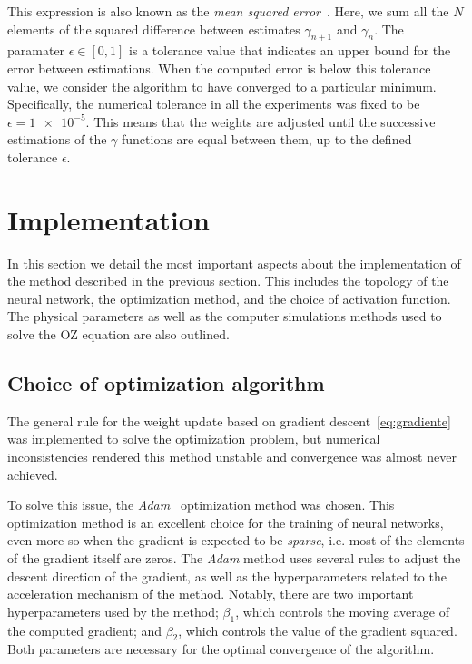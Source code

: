 This expression is also known as the \emph{mean squared error}~\cite{goodfellowDeepLearning2016}.
Here, we sum all the $N$ elements of the squared difference between estimates $\gamma_{n+1}$
and $\gamma_{n}$. The paramater $\epsilon \in [0,1]$ is a tolerance value that indicates an 
upper bound for the error between estimations. When the computed error is below this 
tolerance value, we consider the algorithm to have converged to a particular minimum.
Specifically, the numerical tolerance in all the experiments was fixed to be
$\epsilon = \num{1e-5}$.
This means that the weights are adjusted until the successive estimations of the $\gamma$
functions are equal between them, up to the defined tolerance $\epsilon$.

\section{Implementation}
In this section we detail the most important aspects about the implementation of the
method described in the previous section. This includes the topology of the neural network,
the optimization method, and the choice of activation function. The physical parameters
as well as the computer simulations methods used to solve the OZ equation are also outlined.

\subsection{Choice of optimization algorithm}
The general rule for the weight update based on gradient descent~\eqref{eq:gradiente} was
implemented to solve the optimization problem, but numerical inconsistencies rendered this 
method unstable and convergence was almost never achieved.

To solve this issue, the \emph{Adam}~\cite{kingmaAdamMethodStochastic2017} optimization 
method was chosen. This optimization method is an excellent choice for the training
of neural networks, even more so when the gradient is expected to be \emph{sparse}, i.e.
most of the elements of the gradient itself are zeros.
The \emph{Adam} method uses several rules to adjust the descent direction of the gradient,
as well as the hyperparameters related to the acceleration mechanism of the method.
Notably, there are two important hyperparameters used by the method; $\beta_1$,
which controls the moving average of the computed gradient; and $\beta_2$, which controls
the value of the gradient squared. Both parameters are necessary for the optimal 
convergence of the algorithm.

